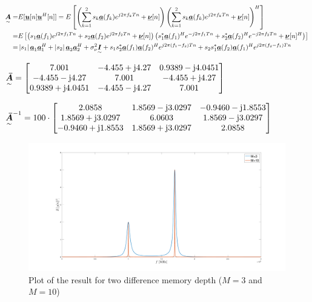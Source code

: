 \begin{doublespace}
\begin{align*}
\ma{A}=&E[\vec{u}[n]\vec{u}^H[n]]=E\left[\left(\sum\limits_{k=1}^{2}s_k\vec{a}(f_k)e^{j2\pi f_k T n}+\vec{\nu}[n]\right)\left(\sum\limits_{k=1}^{2}s_k\vec{a}(f_k)e^{j2\pi f_k T n}+\vec{\nu}[n]\right)^H\right]\\
=&E\left[\left(s_1\vec{a}(f_1)e^{j2\pi f_1 T n}+s_2\vec{a}(f_2)e^{j2\pi f_2 T n}+\vec{\nu}[n]\right)
\left(s_1^*\vec{a}(f_1)^He^{-j2\pi f_1 T n}+s_2^*\vec{a}(f_2)^He^{-j2\pi f_2 T n}+\vec{\nu}[n]^H\right)\right]\\
=&\abs{s_1}\vec{a}_1\vec{a}_1^H+\abs{s_2}\vec{a}_2\vec{a}_2^H+\sigma_\nu^2\ma{I}+s_1s_2^*\vec{a}(f_1)\vec{a}(f_2)^He^{j2\pi (f_1-f_2) T n}+
s_2s_1^*\vec{a}(f_2)\vec{a}(f_1)^He^{j2\pi (f_2-f_1) T n}
\end{align*}

$\ma{\bar{A}}=\mat{7.001&-4.455+\j 4.27&0.9389-\j 4.0451\\-4.455-\j 4.27&7.001&-4.455+\j 4.27\\ 0.9389+\j 4.0451 & -4.455-\j 4.27 & 7.001}$

$\ma{\bar{A}}^{-1}=100\cdot\mat{2.0858&1.8569-\j 3.0297&-0.9460-\j 1.8553\\1.8569+\j 3.0297&6.0603&1.8569-\j 3.0297\\ -0.9460+\j 1.8553 & 1.8569+\j 3.0297 & 2.0858}$

\begin{figure}[H]
	\centering
		\includegraphics[trim =4cm 1cm 4cm 1cm, clip, width=1.00\textwidth]{graphics/ex_spectrum_analyzer_result_plot.pdf}
	\caption{Plot of the result for two difference memory depth ($M=3$ and $M=10$)}
	\label{fig:ex_spectrum_analyzer_result_plot}
\end{figure}

\end{doublespace}

